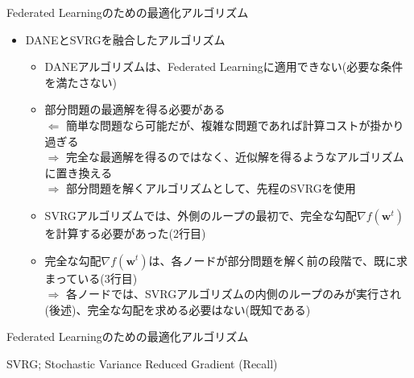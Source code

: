 \documentclass[dvipdfmx,notheorems,t]{beamer}
\begin{document}
\begin{frame}{Federated Learningのための最適化アルゴリズム}

\begin{itemize}
	\item DANEとSVRGを融合したアルゴリズム
	\begin{itemize}
		\item DANEアルゴリズムは、Federated Learningに適用できない(必要な条件を満たさない)
		\item 部分問題の最適解を得る必要がある \\
		$\Leftarrow$ 簡単な問題なら可能だが、複雑な問題であれば計算コストが掛かり過ぎる \\
		$\Rightarrow$ 完全な最適解を得るのではなく、近似解を得るようなアルゴリズムに置き換える \\
		$\Rightarrow$ 部分問題を解くアルゴリズムとして、先程の\alert{SVRG}を使用
		\newline
		
		\item SVRGアルゴリズムでは、外側のループの最初で、完全な勾配$\nabla f(\bm{w}^t)$を計算する必要があった(2行目)
		\item 完全な勾配$\nabla f(\bm{w}^t)$は、各ノードが部分問題を解く前の段階で、既に求まっている(3行目) \\
		$\Rightarrow$ 各ノードでは、SVRGアルゴリズムの内側のループのみが実行され(後述)、完全な勾配を求める必要はない(既知である)
	\end{itemize}
\end{itemize}

\end{frame}

\begin{frame}{Federated Learningのための最適化アルゴリズム}

\begin{algorithm}[H]
	\DontPrintSemicolon
	\caption{SVRG; Stochastic Variance Reduced Gradient (Recall) ~\cite{stochastic_2017}}
	\label{alg:svrg-recall-2}
	\begin{algorithmic}[1]
			 
				 
			\ENDFOR
		\ENDFOR
	\end{algorithmic}
\end{algorithm}

\end{frame}
\end{document}
